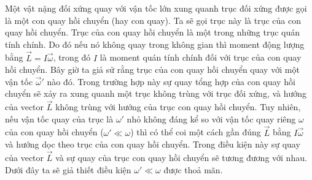 Một vật nặng đối xứng quay với vận tốc lớn xung quanh trục đối xứng được gọi là một con quay hồi chuyển (hay con quay). Ta sẽ gọi trục này là trục của con quay hồi chuyển. Trục của con quay hồi chuyển là một trong những trục quán tính chính. Do đó nếu nó không quay trong không gian thì moment động lượng bằng $\vec{L}=I\vec{\omega}$, trong đó $I$ là moment quán tính chính đối với trục của con quay hồi chuyển. Bây giờ ta giả sử rằng trục của con quay hồi chuyển quay với một vận tốc $\vec{\omega}'$ nào đó. Trong trường hợp này sự quay tổng hợp của con quay hồi chuyển sẽ xảy ra xung quanh một trục không trùng với trục đối xứng, và hướng của vector $\vec{L}$ không trùng với hướng của trục con quay hồi chuyển. Tuy nhiên, nếu vận tốc quay của trục là $\omega'$ nhỏ không đáng kể so với vận tốc quay riêng $\omega$ của con quay hồi chuyển ($\omega'\ll\omega$) thì có thể coi một cách gần đúng $\vec{L}$ bằng $I\vec{\omega}$ và hướng dọc theo trục của con quay hồi chuyển. Trong điều kiện này sự quay của vector $\vec{L}$ và sự quay của trục con quay hồi chuyển sẽ tương đương với nhau. Dưới đây ta sẽ giả thiết điều kiện $\omega'\ll\omega$ được thoả mãn.

